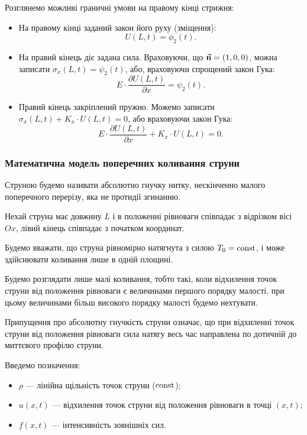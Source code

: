 Розглянемо можливі граничні умови на правому кінці стрижня:
\begin{itemize}
	\item На правому кінці заданий закон його руху (зміщення):
	\begin{equation}
		U(L, t) = \phi_2(t).
	\end{equation}
	\item На правий кінець діє задана сила. Враховуючи, що $\vec{\bf{n}} = (1, 0, 0)$, можна записати $\sigma_x(L, t) = \psi_2(t)$, або, враховуючи спрощений закон Гука:
	\begin{equation}
		E \cdot \frac{\partial U(L, t)}{\partial x} = \psi_2(t).
	\end{equation}
	\item  Правий кінець закріплений пружно. Можемо записати $\sigma_x(L, t) + K_x \cdot U(L, t) = 0$, або враховуючи закон Гука:
	\begin{equation}
		E \cdot \frac{\partial U(L, t)}{\partial x} + K_x \cdot U(L, t) = 0.		
	\end{equation}
\end{itemize}

\subsubsection{Математична модель поперечних коливання струни}

Струною будемо називати абсолютно гнучку нитку, нескінченно малого поперечного перерізу, яка не протидії згинанню. \medskip

Нехай струна має довжину $L$ і в положенні рівноваги співпадає з відрізком вісі $Ox$, лівий кінець співпадає з початком координат. \medskip

Будемо вважати, що струна рівномірно натягнута з силою $T_0 = \const$, і може здійснювати коливання лише в одній площині. \medskip

Будемо розглядати лише малі коливання, тобто такі, коли відхилення точок струни від положення рівноваги є величинами першого порядку малості, при цьому величинами більш високого порядку малості будемо нехтувати. \medskip

Припущення про абсолютну гнучкість струни означає, що при відхиленні точок струни від положення рівноваги сила натягу весь час направлена по дотичній до миттєвого профілю струни. \medskip

Введемо позначення:
\begin{itemize}
	\item $\rho$ --- лінійна щільність точок струни ($\const$);
	\item $u(x, t)$ --- відхилення точок струни від положення рівноваги в точці $(x, t)$;
	\item $f(x, t)$ --- інтенсивність зовнішніх сил.
\end{itemize}

